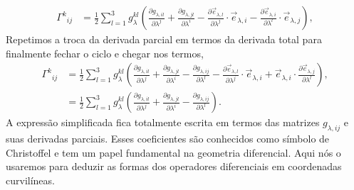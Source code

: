 \begin{equation}
	\begin{split}
		\Gamma^{k}{}_{ij} & =\frac{1}{2} \sum_{l=1}^3g_\lambda^{kl}\left(\frac{\partial g_{\lambda,il}}{\partial\lambda^j}+\frac{\partial g_{\lambda,jl}}{\partial\lambda^i}-\frac{\partial\vec{e}_{\lambda,l}}{\partial\lambda^j}\cdot\vec{e}_{\lambda,i}-\frac{\partial\vec{e}_{\lambda,i}}{\partial\lambda^l}\cdot\vec{e}_{\lambda,j}\right),
	\end{split}
\end{equation}
Repetimos a troca da derivada parcial em termos da derivada total para
finalmente fechar o ciclo e chegar nos termos,
\begin{equation}
	\begin{split}
		\Gamma^{k}{}_{ij} & = \frac{1}{2} \sum_{l=1}^3g_\lambda^{kl}\left(\frac{\partial g_{\lambda,il}}{\partial\lambda^j}+\frac{\partial g_{\lambda,jl}}{\partial\lambda^i} - \frac{\partial g_{\lambda,ij}}{\partial\lambda^l} - \frac{\partial\vec{e}_{\lambda,l}}{\partial\lambda^j}\cdot\vec{e}_{\lambda,i} + \vec{e}_{\lambda,i}\cdot\frac{\partial\vec{e}_{\lambda,j}}{\partial\lambda^l}\right), \\
		                  & =\frac{1}{2} \sum_{l=1}^3g_\lambda^{kl}\left(\frac{\partial g_{\lambda,il}}{\partial\lambda^j}+\frac{\partial g_{\lambda,jl}}{\partial\lambda^i} - \frac{\partial g_{\lambda,ij}}{\partial\lambda^l}\right).
	\end{split}
\end{equation}
A expressão simplificada fica totalmente escrita em termos das matrizes
$g_{\lambda,ij}$ e suas derivadas parciais. Esses coeficientes são conhecidos
como símbolo de Christoffel e tem um papel fundamental na geometria diferencial.
Aqui nós o usaremos para deduzir as formas dos operadores diferenciais em
coordenadas curvilíneas.


